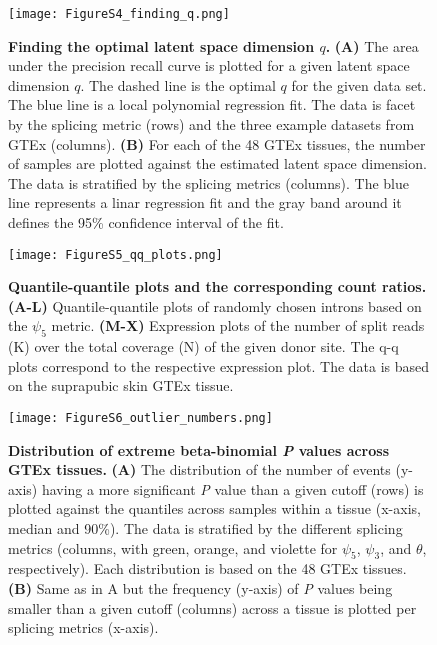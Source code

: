 \documentclass[a4paper,12pt]{article}
\begin{document}
\begin{figure}[h]
	\centering
	\texttt{[image: FigureS4\_finding\_q.png]}
	\caption{
	    \textbf{Finding the optimal latent space dimension $q$.}
	    \textbf{(A)} The area under the precision recall curve is plotted 
for a given latent space dimension $q$. The dashed line is the optimal $q$
for the given data set. The blue line is a local polynomial regression fit.
The data is facet by the splicing metric (rows) and the three example datasets
from GTEx (columns). \textbf{(B)} For each of the 48 GTEx tissues, 
the number of samples are plotted against the estimated latent
space dimension. The data is stratified by the splicing metrics (columns). 
The blue line represents a linar regression fit and the gray band around it
defines the 95\% confidence interval of the fit.
}
\end{figure}
\pagebreak

\begin{figure}[h]
	\centering
	\texttt{[image: FigureS5\_qq\_plots.png]}
	\caption{
	    \textbf{Quantile-quantile plots and the corresponding count ratios.}
	    \textbf{(A-L)} Quantile-quantile plots of randomly chosen introns based
on the $\psi_5$ metric. \textbf{(M-X)} Expression plots of the number of split
reads (K) over the total coverage (N) of the given donor site. The q-q plots 
correspond to the respective expression plot. The data is based on the 
suprapubic skin GTEx tissue.
}
\end{figure}
\pagebreak

\begin{figure}[h]
	\centering
	\texttt{[image: FigureS6\_outlier\_numbers.png]}
	\caption{
	    \textbf{Distribution of extreme beta-binomial \textit{P} values across GTEx tissues.}
	    \textbf{(A)} The distribution of the number of events (y-axis) having a more 
	    significant \textit{P} value than a given cutoff (rows) is plotted
	    against the quantiles across samples within a tissue 
	    (x-axis, median and 90\%). The data is stratified by the different splicing 
	    metrics (columns, with green, orange, and violette for 
	    $\psi_5$, $\psi_3$, and $\theta$, respectively). 
	    Each distribution is based on the 48 GTEx tissues.
	    \textbf{(B)} Same as in A but the frequency (y-axis) of \textit{P} values 
	    being smaller than a given cutoff (columns) across a tissue is plotted per 
	    splicing metrics (x-axis).
}
\end{figure}
\pagebreak
\end{document}
